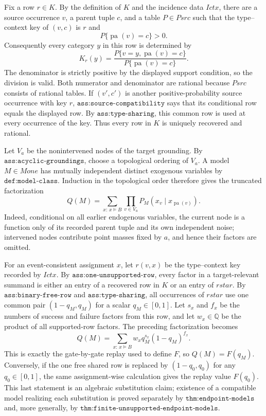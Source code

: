 Fix a row \(r\in K\).  By the definition of \(K\) and the incidence data \(Ictx\), there are a source occurrence \(v\), a parent tuple \(c\), and a table \(P\in Psrc\) such that the type--context key of \((v,c)\) is \(r\) and
\[
 P\{\operatorname{pa}(v)=c\}>0.
\]
Consequently every category \(y\) in this row is determined by
\[
 K_r(y)=
 \frac{P\{v=y,\operatorname{pa}(v)=c\}}
      {P\{\operatorname{pa}(v)=c\}}.
\]
The denominator is strictly positive by the displayed support condition, so the division is valid.  Both numerator and denominator are rational because \(Psrc\) consists of rational tables.  If \((v',c')\) is another positive-probability source occurrence with key \(r\), \(\texttt{ass:source-compatibility}\) says that its conditional row equals the displayed row.  By \(\texttt{ass:type-sharing}\), this common row is used at every occurrence of the key.  Thus every row in \(K\) is uniquely recovered and rational.

Let \(V_a\) be the nonintervened nodes of the target grounding.  By \(\texttt{ass:acyclic-groundings}\), choose a topological ordering of \(V_a\).  A model \(M\in Mone\) has mutually independent distinct exogenous variables by \(\texttt{def:model-class}\).  Induction in the topological order therefore gives the truncated factorization
\[
 Q(M)
 =\sum_{x:\,x\models B}
   \prod_{v\in V_a}
   P_M\!\left(x_v\mid x_{\operatorname{pa}(v)}\right).
\]
Indeed, conditional on all earlier endogenous variables, the current node is a function only of its recorded parent tuple and its own independent noise; intervened nodes contribute point masses fixed by \(a\), and hence their factors are omitted.

For an event-consistent assignment \(x\), let \(r(v,x)\) be the type--context key recorded by \(Ictx\).  By \(\texttt{ass:one-unsupported-row}\), every factor in a target-relevant summand is either an entry of a recovered row in \(K\) or an entry of \(rstar\).  By \(\texttt{ass:binary-free-row}\) and \(\texttt{ass:type-sharing}\), all occurrences of \(rstar\) use one common pair \((1-q_M,q_M)\) for a scalar \(q_M\in[0,1]\).  Let \(s_x\) and \(f_x\) be the numbers of success and failure factors from this row, and let \(w_x\in\mathbb Q\) be the product of all supported-row factors.  The preceding factorization becomes
\[
 Q(M)=\sum_{x:\,x\models B}
 w_x q_M^{s_x}(1-q_M)^{f_x}.
\]
This is exactly the gate-by-gate replay used to define \(F\), so \(Q(M)=F(q_M)\).  Conversely, if the one free shared row is replaced by \((1-q_0,q_0)\) for any \(q_0\in[0,1]\), the same assignment-wise calculation gives the replay value \(F(q_0)\).  This last statement is an algebraic substitution claim; existence of a compatible model realizing each substitution is proved separately by \(\texttt{thm:endpoint-models}\) and, more generally, by \(\texttt{thm:finite-unsupported-endpoint-models}\).

